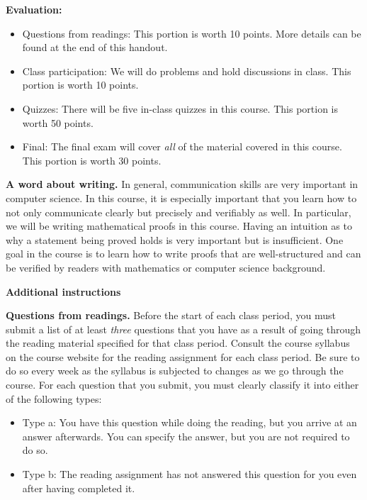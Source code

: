 \documentclass{article}
\newcommand{\bheading}[1]{\vspace{10pt} \noindent \textbf{#1}}
\begin{document}
\bheading{Evaluation:} 
\begin{itemize}
\item Questions from readings: This portion is worth 10 points. More details can be found at the end of this handout.
\item Class participation: We will do problems and hold discussions in class. This portion is worth 10 points.
\item Quizzes: There will be five in-class quizzes in this course. This portion is worth 50 points.
\item Final: The final exam will cover \textit{all} of the material covered in this course. This portion is worth 30 points.
\end{itemize}

\bheading{A word about writing.} In general, communication skills are very important in computer science. In this course, it is especially important that you learn how to not only communicate clearly but precisely and verifiably as well. In particular, we will be writing mathematical proofs in this course. Having an intuition as to why a statement being proved holds is very important but is insufficient. One goal in the course is to learn how to write proofs that are well-structured and can be verified by readers with mathematics or computer science background.

\newpage

\begin{center}
  \Large{\textbf{Additional instructions}}
\end{center}

\bheading{Questions from readings.} Before the start of each class period, you must submit a list of at least \textit{three} questions that you have as a result of going through the reading material specified for that class period. Consult the course syllabus on the course website for the reading assignment for each class period. Be sure to do so every week as the syllabus is subjected to changes as we go through the course. For each question that you submit, you must clearly classify it into either of the following types:
\begin{itemize}
  \item Type a: You have this question while doing the reading, but you arrive at an answer afterwards. You can specify the answer, but you are not required to do so.
  \item Type b: The reading assignment has not answered this question for you even after having completed it.
\end{itemize}
\end{document}
